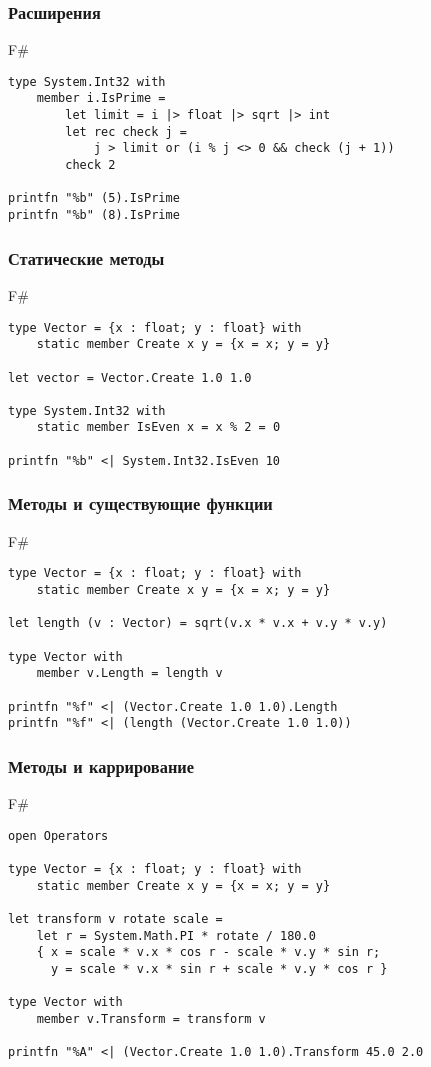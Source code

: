 \documentclass[xetex,mathserif,serif]{beamer}
\begin{document}
	\begin{frame}[fragile]
		\frametitle{Расширения}
		\begin{exampleblock}{F\#}
			\begin{verbatim}
type System.Int32 with
    member i.IsPrime = 
        let limit = i |> float |> sqrt |> int
        let rec check j =
            j > limit or (i % j <> 0 && check (j + 1))
        check 2

printfn "%b" (5).IsPrime
printfn "%b" (8).IsPrime
			\end{verbatim}
		\end{exampleblock}
\end{frame}

	\begin{frame}[fragile]
		\frametitle{Статические методы}
		\begin{exampleblock}{F\#}
			\begin{verbatim}
type Vector = {x : float; y : float} with
    static member Create x y = {x = x; y = y}

let vector = Vector.Create 1.0 1.0

type System.Int32 with
    static member IsEven x = x % 2 = 0

printfn "%b" <| System.Int32.IsEven 10
			\end{verbatim}
		\end{exampleblock}
\end{frame}

	\begin{frame}[fragile]
		\frametitle{Методы и существующие функции}
		\begin{exampleblock}{F\#}
			\begin{verbatim}
type Vector = {x : float; y : float} with
    static member Create x y = {x = x; y = y}

let length (v : Vector) = sqrt(v.x * v.x + v.y * v.y)

type Vector with
    member v.Length = length v

printfn "%f" <| (Vector.Create 1.0 1.0).Length
printfn "%f" <| (length (Vector.Create 1.0 1.0))
			\end{verbatim}
		\end{exampleblock}
\end{frame}

	\begin{frame}[fragile]
		\frametitle{Методы и каррирование}
		\begin{exampleblock}{F\#}
			\begin{verbatim}
open Operators

type Vector = {x : float; y : float} with
    static member Create x y = {x = x; y = y}

let transform v rotate scale = 
    let r = System.Math.PI * rotate / 180.0
    { x = scale * v.x * cos r - scale * v.y * sin r;
      y = scale * v.x * sin r + scale * v.y * cos r }

type Vector with
    member v.Transform = transform v

printfn "%A" <| (Vector.Create 1.0 1.0).Transform 45.0 2.0
			\end{verbatim}
		\end{exampleblock}
\end{frame}
	
\end{document}

